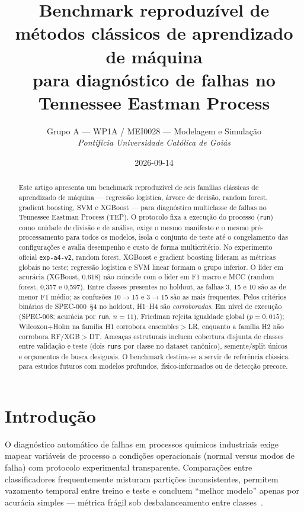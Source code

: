\documentclass[11pt,a4paper]{article}
\title{Benchmark reproduzível de métodos clássicos de aprendizado de máquina\\
para diagnóstico de falhas no Tennessee Eastman Process}
\author{Grupo A --- WP1A / MEI0028 --- Modelagem e Simulação\\
\textit{Pontifícia Universidade Católica de Goiás}}
\date{2026-09-14}
\begin{document}
\maketitle

\begin{abstract}
Este artigo apresenta um benchmark reproduzível de seis famílias clássicas de
aprendizado de máquina --- regressão logística, árvore de decisão, random forest,
gradient boosting, SVM e XGBoost --- para diagnóstico multiclasse de falhas no
Tennessee Eastman Process (TEP). O protocolo fixa a execução do processo
(\texttt{run}) como unidade de divisão e de análise, exige o mesmo manifesto e
o mesmo pré-processamento para todos os modelos, isola o conjunto de teste até o
congelamento das configurações e avalia desempenho e custo de forma multicritério.
No experimento oficial \texttt{exp-a4-v2}, random forest, XGBoost e gradient
boosting lideram as métricas globais no teste; regressão logística e SVM linear
formam o grupo inferior. O líder em acurácia (XGBoost, 0,618) não coincide com o
líder em F1 macro e MCC (random forest, 0,357 e 0,597). Entre classes presentes
no holdout, as falhas 3, 15 e 10 são as de menor F1 médio; as confusões 10$\to$15
e 3$\to$15 são as mais frequentes. Pelos critérios binários de SPEC-000~\S4
no holdout, H1--H4 são \emph{corroboradas}. Em nível de execução (SPEC-008;
acurácia por \texttt{run}, $n{=}11$), Friedman rejeita igualdade global
($p{=}0{,}015$); Wilcoxon+Holm na família H1 corrobora ensembles${>}$LR, enquanto
a família H2 não corrobora RF/XGB${>}$DT. Ameaças estruturais incluem
cobertura disjunta de classes entre validação e teste (dois \texttt{runs} por
classe no dataset canônico), semente/split únicos e orçamentos de busca
desiguais. O benchmark destina-se a servir de referência clássica
para estudos futuros com modelos profundos, físico-informados ou de detecção precoce.
\end{abstract}

\tableofcontents
\newpage

\section{Introdução}
\label{sec:intro}

O diagnóstico automático de falhas em processos químicos industriais exige
mapear variáveis de processo a condições operacionais (normal versus modos de
falha) com protocolo experimental transparente. Comparações entre classificadores
frequentemente misturam partições inconsistentes, permitem vazamento temporal
entre treino e teste e concluem ``melhor modelo'' apenas por acurácia simples ---
métrica frágil sob desbalanceamento entre classes~\cite{chiang2001fault,yin2012tep}.
\end{document}
